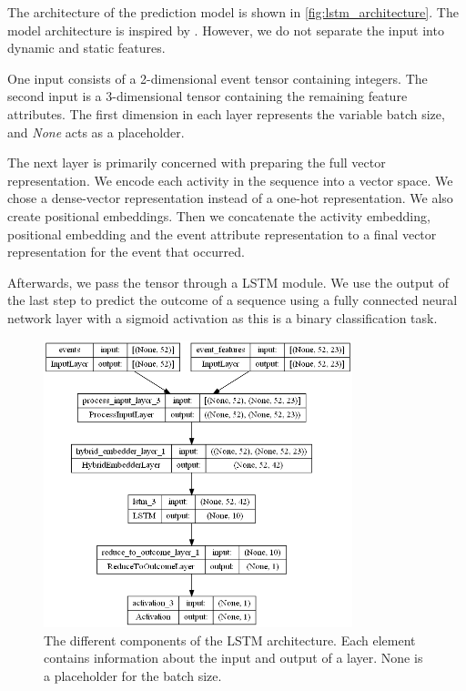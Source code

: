 \documentclass[./../../paper.tex]{subfiles}
\begin{document}
The architecture of the prediction model is shown in \autoref{fig:lstm_architecture}. The model architecture is inspired by \citeauthor{hsieh_DiCE4ELInterpretingProcess_2021}. However, we do not separate the input into dynamic and static features.

One input consists of a 2-dimensional event tensor containing integers. The second input is a 3-dimensional tensor containing the remaining feature attributes. The first dimension in each layer represents the variable batch size, and \emph{None} acts as a placeholder.

The next layer is primarily concerned with preparing the full vector representation. We encode each activity in the sequence into a vector space. We chose a dense-vector representation instead of a one-hot representation. We also create positional embeddings. Then we concatenate the activity embedding, positional embedding and the event attribute representation to a final vector representation for the event that occurred.

Afterwards, we pass the tensor through a \gls{LSTM} module. We use the output of the last step to predict the outcome of a sequence using a fully connected neural network layer with a sigmoid activation as this is a binary classification task. 

\begin{figure}[htbp]
    \centering
    \includegraphics[width=0.8\textwidth]{figures/predictor50lstm.png}
    \caption{The different components of the LSTM architecture. Each element contains information about the input and output of a layer. None is a placeholder for the batch size.}
    \label{fig:lstm_architecture}
\end{figure}
\end{document}
